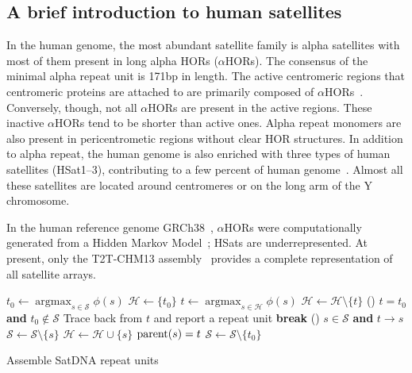 \documentclass{bioinfo}
\DeclareMathOperator*{\argmax}{argmax}
\begin{document}
\subsection{A brief introduction to human satellites}

In the human genome, the most abundant satellite family is alpha satellites
with most of them present in long alpha HORs ($\alpha$HORs). The
consensus of the minimal alpha repeat unit is 171bp in length. The active
centromeric regions that centromeric proteins are attached to are primarily
composed of $\alpha$HORs~\citep{Altemose:2022tv}. Conversely, though, not all
$\alpha$HORs are present in the active regions. These inactive $\alpha$HORs
tend to be shorter than active ones. Alpha repeat monomers are also present in
pericentrometic regions without clear HOR structures. In addition to alpha
repeat, the human genome is also enriched with three types of human satellites
(HSat1--3), contributing to a few percent of human
genome~\citep{Altemose:2022vw}. Almost all these satellites are located around
centromeres or on the long arm of the Y chromosome.

In the human reference genome GRCh38~\citep{Schneider:2017aa}, $\alpha$HORs
were computationally generated from a Hidden Markov Model~\citep{Miga:2014aa};
HSats are underrepresented. At present, only the T2T-CHM13
assembly~\citep{Nurk:2022up} provides a complete representation of all
satellite arrays.

\begin{algorithm}[tb]
\DontPrintSemicolon
\footnotesize
{}
\BlankLine
{} {
	$t_0\gets\argmax_{s\in\mathcal{S}}\phi(s)$
	$\mathcal{H}\gets\{t_0\}$\;
	 {
		$t\gets\argmax_{s\in\mathcal{H}}\phi(s)$
		$\mathcal{H}\gets\mathcal{H}\setminus\{t\}$
		\If () {$t=t_0$ {\bf and} $t_0\not\in\mathcal{S}$} {
			Trace back from $t$ and report a repeat unit\;
			{\bf break}\;
		}
		\For () {$s\in\mathcal{S}$ {\bf and} $t\to s$} {
			$\mathcal{S}\gets\mathcal{S}\setminus\{s\}$\;
			$\mathcal{H}\gets\mathcal{H}\cup\{s\}$
			${\rm parent}(s)=t$
		}
	}
	$\mathcal{S}\gets\mathcal{S}\setminus\{t_0\}$
}
\caption{Assemble SatDNA repeat units}\label{alg:srf}
\end{algorithm}
\end{document}
